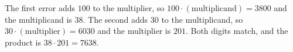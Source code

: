 The first error adds $100$ to the multiplier, so $100\cdot(\text{multiplicand})=3800$ and the multiplicand is $38$. The second adds $30$ to the multiplicand, so $30\cdot(\text{multiplier})=6030$ and the multiplier is $201$. Both digits match, and the product is $38\cdot201=\boxed{7638}$.
